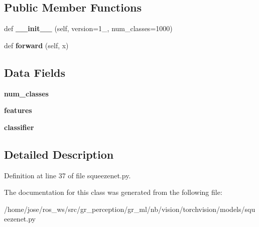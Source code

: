 \subsection*{Public Member Functions}
\begin{DoxyCompactItemize}
\item 
\mbox{\label{classtorchvision_1_1models_1_1squeezenet_1_1SqueezeNet_acf5b2738a5113bac3ae53509b300994a}} 
def {\bfseries \+\_\+\+\_\+init\+\_\+\+\_\+} (self, version=\textquotesingle{}1\+\_\textquotesingle{}, num\+\_\+classes=1000)
\item 
\mbox{\label{classtorchvision_1_1models_1_1squeezenet_1_1SqueezeNet_a89719809c78ab9d4d4d541d9c79dd953}} 
def {\bfseries forward} (self, x)
\end{DoxyCompactItemize}
\subsection*{Data Fields}
\begin{DoxyCompactItemize}
\item 
\mbox{\label{classtorchvision_1_1models_1_1squeezenet_1_1SqueezeNet_a6a01ad083f621769c6157be6b7682e0e}} 
{\bfseries num\+\_\+classes}
\item 
\mbox{\label{classtorchvision_1_1models_1_1squeezenet_1_1SqueezeNet_aa16d60fca96f321e3222270b6e8d7b55}} 
{\bfseries features}
\item 
\mbox{\label{classtorchvision_1_1models_1_1squeezenet_1_1SqueezeNet_a9cce19a32a0f352d6c82bbcc4a5fd5cc}} 
{\bfseries classifier}
\end{DoxyCompactItemize}


\subsection{Detailed Description}


Definition at line 37 of file squeezenet.\+py.



The documentation for this class was generated from the following file\+:\begin{DoxyCompactItemize}
\item 
/home/jose/ros\+\_\+ws/src/gr\+\_\+perception/gr\+\_\+ml/nb/vision/torchvision/models/squeezenet.\+py\end{DoxyCompactItemize}

